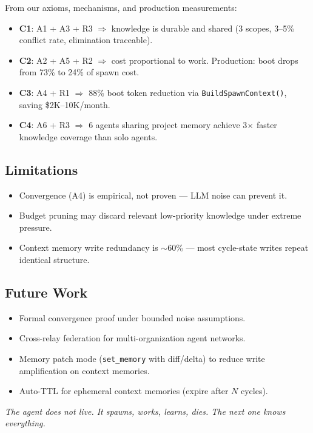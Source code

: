 \documentclass{article}
\begin{document}
From our axioms, mechanisms, and production measurements:
\begin{itemize}[nosep]
  \item \textbf{C1}: A1 + A3 + R3 $\Rightarrow$ knowledge is durable and shared (3 scopes, 3--5\% conflict rate, elimination traceable).
  \item \textbf{C2}: A2 + A5 + R2 $\Rightarrow$ cost proportional to work. Production: boot drops from 73\% to 24\% of spawn cost.
  \item \textbf{C3}: A4 + R1 $\Rightarrow$ 88\% boot token reduction via \texttt{BuildSpawnContext()}, saving \$2K--10K/month.
  \item \textbf{C4}: A6 + R3 $\Rightarrow$ 6 agents sharing project memory achieve 3$\times$ faster knowledge coverage than solo agents.
\end{itemize}

\subsection{Limitations}

\begin{itemize}[nosep]
  \item Convergence (A4) is empirical, not proven --- LLM noise can prevent it.
  \item Budget pruning may discard relevant low-priority knowledge under extreme pressure.
  \item Context memory write redundancy is $\sim$60\% --- most cycle-state writes repeat identical structure.
\end{itemize}

\subsection{Future Work}

\begin{itemize}[nosep]
  \item Formal convergence proof under bounded noise assumptions.
  \item Cross-relay federation for multi-organization agent networks.
  \item Memory patch mode (\texttt{set\_memory} with diff/delta) to reduce write amplification on context memories.
  \item Auto-TTL for ephemeral context memories (expire after $N$ cycles).
\end{itemize}

\bigskip
\begin{center}
\textit{The agent does not live. It spawns, works, learns, dies. The next one knows everything.}
\end{center}


\end{document}

